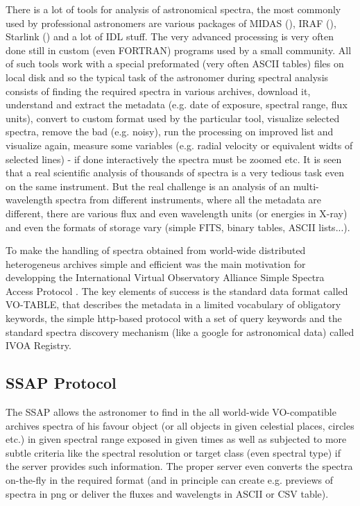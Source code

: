 \documentclass[final,authoryear,5p,times,twocolumn]{elsarticle}
\begin{document}
There is a lot of tools for analysis of astronomical spectra, the most commonly
used by professional astronomers are various packages of MIDAS
(), IRAF (), Starlink () and a lot
of IDL stuff. The very advanced processing is very often done still in custom
(even FORTRAN) programs used by a small community.  All of such tools work with
a special preformated (very often ASCII tables)  files on local disk and so the
typical task of the astronomer during spectral analysis consists of finding the
required spectra in various archives, download it, understand and extract the
metadata (e.g. date of exposure, spectral range, flux units),  convert to
custom format used by the particular tool, visualize selected spectra, remove
the bad (e.g. noisy), run the processing on improved list and visualize again,
measure some variables (e.g. radial velocity or equivalent widts of selected
lines) - if done interactively the spectra must be zoomed etc.  It is seen that
a real scientific analysis of thousands of spectra is a very tedious task even
on the same instrument. But the real challenge is an analysis of an
multi-wavelength spectra from different instruments, where all the metadata are
different, there are various flux and even wavelength units (or energies in
X-ray) and even the formats of storage vary (simple FITS, binary tables, ASCII
lists...).

To make the handling of spectra obtained from world-wide  distributed
heterogeneus archives simple and efficient was the main motivation for
developping the International Virtual Observatory Alliance Simple Spectra
Access Protocol \citep[IVOA SSAP;][]{ssap}. The key elements of success is the standard data
format called VO-TABLE, that describes the metadata in a limited vocabulary of
obligatory keywords, the simple http-based protocol with a set of query keywords
and the standard spectra discovery mechanism (like a google for astronomical
data) called IVOA Registry.


\subsection{SSAP Protocol}


The SSAP allows the astronomer to find in the all world-wide VO-compatible
archives spectra of his favour object (or all objects in given celestial
places, circles etc.) in given spectral range exposed in given times as well as
subjected to more subtle criteria like the spectral resolution or target class
(even spectral type) if the server provides such information.  The proper
server even converts the spectra on-the-fly in the required format (and in
principle can create e.g. previews of spectra in png or deliver the fluxes and
wavelengts in ASCII or CSV table).
\end{document}
